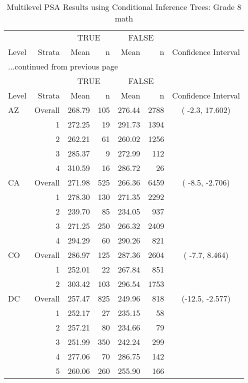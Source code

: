 \begin{longtable}{lrrr@{\extracolsep{.25cm}}rrc}
\caption{Multilevel PSA Results using Conditional Inference Trees: Grade 8 math} \\ 
   \hline & & \multicolumn{2}{c}{TRUE} & \multicolumn{2}{c}{FALSE} & \\ \cline{3-4} \cline{5-6} Level & Strata & Mean & n & Mean & n & Confidence Interval \\ \hline\endfirsthead \multicolumn{7}{l}{{...continued from previous page}}\\ \hline  & & \multicolumn{2}{c}{TRUE} & \multicolumn{2}{c}{FALSE} & \\ \cline{3-4} \cline{5-6} Level & Strata & Mean & n & Mean & n & Confidence Interval \\ \hline \endhead \endfoot \endlastfoot  \hline
AZ & Overall & 268.79 & 105 & 276.44 & 2788 & ( -2.3, 17.602) \\ 
   & 1 & 272.25 &  19 & 291.73 & 1394 &  \\ 
   & 2 & 262.21 &  61 & 260.02 & 1256 &  \\ 
   & 3 & 285.37 &   9 & 272.99 & 112 &  \\ 
   & 4 & 310.59 &  16 & 286.72 &  26 &  \\ 
   \hline
CA & Overall & 271.98 & 525 & 266.36 & 6459 & ( -8.5, -2.706) \\ 
   & 1 & 278.30 & 130 & 271.35 & 2292 &  \\ 
   & 2 & 239.70 &  85 & 234.05 & 937 &  \\ 
   & 3 & 271.25 & 250 & 266.32 & 2409 &  \\ 
   & 4 & 294.29 &  60 & 290.26 & 821 &  \\ 
   \hline
CO & Overall & 286.97 & 125 & 287.36 & 2604 & ( -7.7,  8.464) \\ 
   & 1 & 252.01 &  22 & 267.84 & 851 &  \\ 
   & 2 & 303.42 & 103 & 296.54 & 1753 &  \\ 
   \hline
DC & Overall & 257.47 & 825 & 249.96 & 818 & (-12.5, -2.577) \\ 
   & 1 & 252.17 &  27 & 235.15 &  58 &  \\ 
   & 2 & 257.21 &  80 & 234.66 &  79 &  \\ 
   & 3 & 251.99 & 350 & 242.24 & 299 &  \\ 
   & 4 & 277.06 &  70 & 286.75 & 142 &  \\ 
   & 5 & 260.06 & 260 & 255.90 & 166 &  \\ 

\end{longtable}
